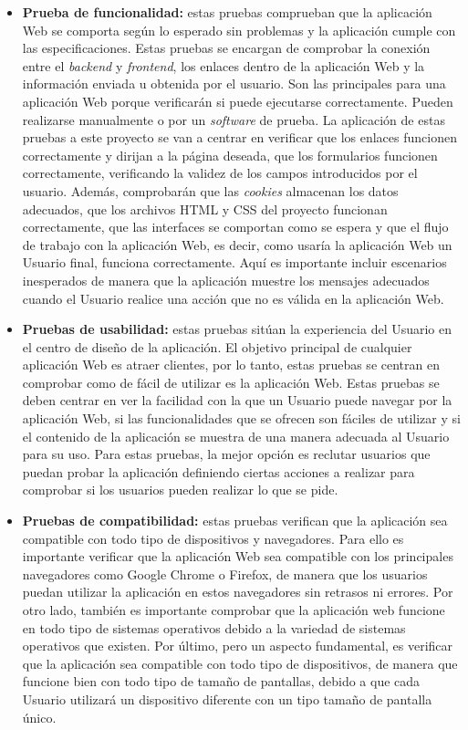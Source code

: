 \begin{itemize}
    \item \textbf{Prueba de funcionalidad:} estas pruebas comprueban que la aplicación Web se comporta según lo esperado sin problemas y la aplicación cumple con las especificaciones. Estas pruebas se encargan de comprobar la conexión entre el \textit{backend} y \textit{frontend}, los enlaces dentro de la aplicación Web y la información enviada u obtenida por el usuario. Son las principales para una aplicación Web porque verificarán si puede ejecutarse correctamente. Pueden realizarse manualmente o por un \textit{software} de prueba. La aplicación de estas pruebas a este proyecto se van a centrar en verificar que los enlaces funcionen correctamente y dirijan a la página deseada, que los formularios funcionen correctamente, verificando la validez de los campos introducidos por el usuario. Además, comprobarán que las \textit{cookies} almacenan los datos adecuados, que los archivos HTML y CSS del proyecto funcionan correctamente, que las interfaces se comportan como se espera y que el flujo de trabajo con la aplicación Web, es decir, como usaría la aplicación Web un Usuario final, funciona correctamente. Aquí es importante incluir escenarios inesperados de manera que la aplicación muestre los mensajes adecuados cuando el Usuario realice una acción que no es válida en la aplicación Web.
     
    \item \textbf{Pruebas de usabilidad:} estas pruebas sitúan la experiencia del Usuario en el centro de diseño de la aplicación. El objetivo principal de cualquier aplicación Web es atraer clientes, por lo tanto, estas pruebas se centran en comprobar como de fácil de utilizar es la aplicación Web. Estas pruebas se deben centrar en ver la facilidad con la que un Usuario puede navegar por la aplicación Web, si las funcionalidades que se ofrecen son fáciles de utilizar y si el contenido de la aplicación se muestra de una manera adecuada al Usuario para su uso. Para estas pruebas, la mejor opción es reclutar usuarios que puedan probar la aplicación definiendo ciertas acciones a realizar para comprobar si los usuarios pueden realizar lo que se pide. 
    
    \item \textbf{Pruebas de compatibilidad:} estas pruebas verifican que la aplicación sea compatible con todo tipo de dispositivos y navegadores. Para ello es importante verificar que la aplicación Web sea compatible con los principales navegadores como Google Chrome o Firefox, de manera que los usuarios puedan utilizar la aplicación en estos navegadores sin retrasos ni errores. Por otro lado, también es importante comprobar que la aplicación web funcione en todo tipo de sistemas operativos debido a la variedad de sistemas operativos que existen. Por último, pero un aspecto fundamental, es verificar que la aplicación sea compatible con todo tipo de dispositivos, de manera que funcione bien con todo tipo de tamaño de pantallas, debido a que cada Usuario utilizará un dispositivo diferente con un tipo  tamaño de pantalla único.
  
    
    
\end{itemize}

